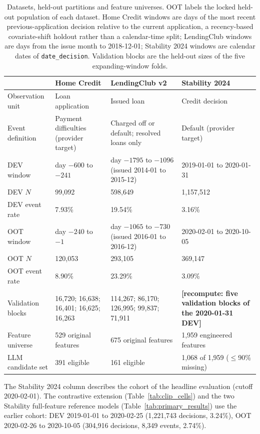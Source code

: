 \documentclass[final,5p,twocolumn]{elsarticle}
\begin{document}
\begin{table}[htbp]
\centering
\footnotesize
\begin{threeparttable}
\caption{Datasets, held-out partitions and feature universes. OOT labels the locked held-out population of each dataset. Home Credit windows are days of the most recent previous-application decision relative to the current application, a recency-based covariate-shift holdout rather than a calendar-time split; LendingClub windows are days from the issue month to 2018-12-01; Stability 2024 windows are calendar dates of \texttt{date\_decision}. Validation blocks are the held-out sizes of the five expanding-window folds.}
\label{tab:datasets}
\begin{tabular}{@{}lL{29mm}L{31mm}L{31mm}@{}}
\toprule
 & Home Credit & LendingClub v2 & Stability 2024 \\
\midrule
Observation unit & Loan application & Issued loan & Credit decision \\
Event definition & Payment difficulties (provider target) & Charged off or default; resolved loans only & Default (provider target) \\
DEV window & day $-600$ to $-241$ & day $-1795$ to $-1096$ (issued 2014-01 to 2015-12) & 2019-01-01 to 2020-01-31 \\
DEV $N$ & 99,092 & 598,649 & 1,157,512 \\
DEV event rate & 7.93\% & 19.54\% & 3.16\% \\
OOT window & day $-240$ to $-1$ & day $-1065$ to $-730$ (issued 2016-01 to 2016-12) & 2020-02-01 to 2020-10-05 \\
OOT $N$ & 120,053 & 293,105 & 369,147 \\
OOT event rate & 8.90\% & 23.29\% & 3.09\% \\
Validation blocks & 16,720; 16,638; 16,401; 16,625; 16,263 & 114,267; 86,170; 126,995; 99,837; 71,911 & \textbf{[recompute: five validation blocks of the 2020-01-31 DEV]} \\ %
Feature universe & 529 original features & 675 original features & 1,959 engineered features \\
LLM candidate set & 391 eligible & 161 eligible & 1,068 of 1,959 ($\le$90\% missing) \\
\bottomrule
\end{tabular}
\begin{tablenotes}\footnotesize
\item The Stability 2024 column describes the cohort of the headline evaluation (cutoff 2020-02-01). The contrastive extension (Table~\ref{tab:clip_cells}) and the two Stability full-feature reference models (Table~\ref{tab:primary_results}) use the earlier cohort: DEV 2019-01-01 to 2020-02-25 (1,221,743 decisions, 3.24\%), OOT 2020-02-26 to 2020-10-05 (304,916 decisions, 8,349 events, 2.74\%).
\end{tablenotes}
\end{threeparttable}
\end{table}
\end{document}
